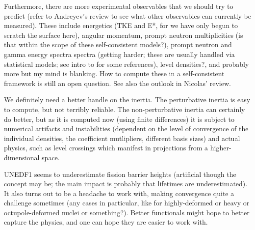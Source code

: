 Furthermore, there are more experimental observables that we should try to predict (refer to Andreyev's review to see what other observables can currently be measured). These include energetics (TKE and E*, for we have only begun to scratch the surface here), angular momentum, prompt neutron multiplicities (is that within the scope of these self-consistent models?), prompt neutron and gamma energy spectra spectra (getting harder; these are usually handled via statistical models; see intro to \cite{Schmidt2018} for some references), level densities?, and probably more but my mind is blanking. How to compute these in a self-consistent framework is still an open question. See also the outlook in Nicolas' review.

We definitely need a better handle on the inertia. The perturbative inertia is easy to compute, but not terribly reliable. The non-perturbative inertia can certainly do better, but as it is computed now (using finite differences) it is subject to numerical artifacts and instabilities (dependent on the level of convergence of the individual densities, the coefficient mutlipliers, different basis sizes) and actual physics, such as level crossings which manifest in projections from a higher-dimensional space.

UNEDF1 seems to underestimate fission barrier heights (artificial though the concept may be; the main impact is probably that lifetimes are underestimated). It also turns out to be a headache to work with, making convergence quite a challenge sometimes (any cases in particular, like for highly-deformed or heavy or octupole-deformed nuclei or something?). Better functionals might hope to better capture the physics, and one can hope they are easier to work with.